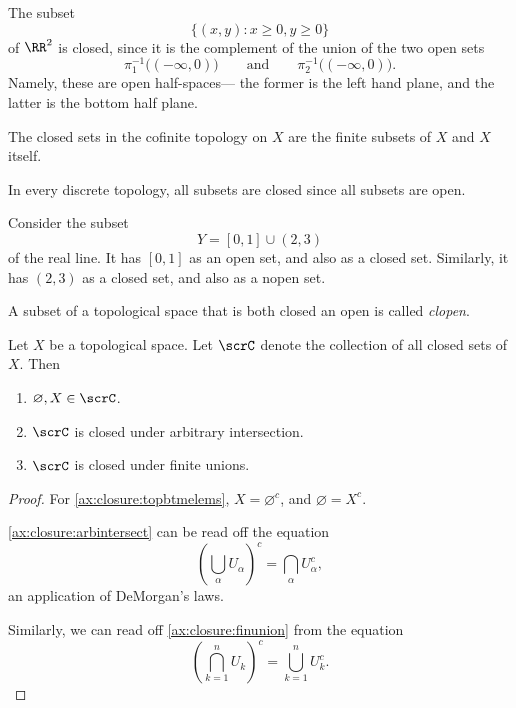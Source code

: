 \documentclass{article}
\begin{document}
\begin{example}
    The subset
    \[
        \{(x,y): x \geq 0, y \geq 0\}
    \]
    of $\RR^2$ is closed, since it is the complement of the union of the two open sets
    \[
        \pi_1^{-1}\Big((-\infty, 0)\Big) \qquad \text{and} \qquad \pi_2^{-1}\Big((-\infty, 0)\Big).
    \]
    Namely, these are open half-spaces--- the former is the left hand plane, and the latter is the bottom half plane.
\end{example}

\begin{example}
    The closed sets in the cofinite topology on $X$ are the finite subsets of $X$ and $X$ itself.
\end{example}

\begin{example}
    In every discrete topology, all subsets are closed since all subsets are open.
\end{example}

\begin{example}
    Consider the subset 
    \[
        Y = [0,1] \cup (2,3)
    \]
    of the real line.
    It has $[0,1]$ as an open set, and also as a closed set.
    Similarly, it has $(2,3)$ as a closed set, and also as a nopen set.
\end{example}

\begin{definition}
    A subset of a topological space that is both closed an open is called \textit{clopen}.
\end{definition}

\begin{theorem}
    Let $X$ be a topological space.
    Let $\scrC$ denote the collection of all closed sets of $X$.
    Then
    \begin{enumerate}[label=(C\arabic*)]
        \item $\varnothing, X \in \scrC$. \label{ax:closure:topbtmelems}
        \item $\scrC$ is closed under arbitrary intersection. \label{ax:closure:arbintersect}
        \item $\scrC$ is closed under finite unions. \label{ax:closure:finunion}
    \end{enumerate}
\end{theorem}

\begin{proof}
    For \ref{ax:closure:topbtmelems}, $X = \varnothing^c$, and $\varnothing = X^c$.

    \ref{ax:closure:arbintersect} can be read off the equation
    \[
        \left(\bigcup_\alpha U_\alpha\right)^c = \bigcap_\alpha U_\alpha^c,
    \]
    an application of DeMorgan's laws.

    Similarly, we can read off \ref{ax:closure:finunion} from the equation
    \[
        \left(\bigcap_{k=1}^n U_k\right)^c = \bigcup_{k=1}^n U_k^c.
    \]
\end{proof}
\end{document}
